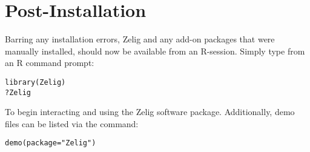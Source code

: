 %



\section{Post-Installation}

Barring any installation errors, Zelig and any add-on packages that were manually installed, should now be available from an R-session. Simply type from an R command prompt:

\begin{verbatim}
library(Zelig)
?Zelig
\end{verbatim}

To begin interacting and using the Zelig software package. Additionally, demo files can be listed via the command:

\begin{verbatim}
demo(package="Zelig")
\end{verbatim}








